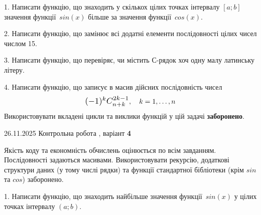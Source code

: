 \documentclass[11pt, ukrainian]{article}
\begin{document}
{{{\vspace{2mm}

\begin {large}
1. Написати функцію, що знаходить у скількох цілих точках інтервалу $[a; b]$ значення функції~$sin(x)$ більше за значення функції~$cos(x)$.

\vspace{2mm}


2. Написати функцію, що замінює всі додатні елементи послідовності цілих чисел числом 15.

\vspace{2mm}


3. Написати функцію, що перевіряє, чи містить С-рядок хоч одну малу латинську літеру.

\vspace{2mm}


4. 
Написати функцію, що записує в масив дійсних послідовність чисел
$$\scalebox{1.2}{$(-1)^{k}C_{n+k}^{2k-1}$}, \quad k=1,\ldots,n$$
\quad Використовувати вкладені цикли та виклики функцій у цій задачі \textbf{заборонено}.

\vspace{2mm}

\end{large}
\newpage
{{26.11.2025 Контрольна робота , варіант  \No \textbf { 4 }\par}}


{
Якість коду та економність обчислень оцінюється по всім завданням. Послідовності задаються масивами. Використовувати рекурсію, додаткові структури даних (у тому числі рядки) та функції стандартної бібліотеки (крім $sin$ та $cos$) заборонено.

\vspace{2mm}

\begin {large}
1. Написати функцію, що знаходить найбільше значення функції~$sin(x)$ у цілих точках інтервалу $(a; b)$.

\vspace{2mm}


\end{large}}}}}
\end{document}
